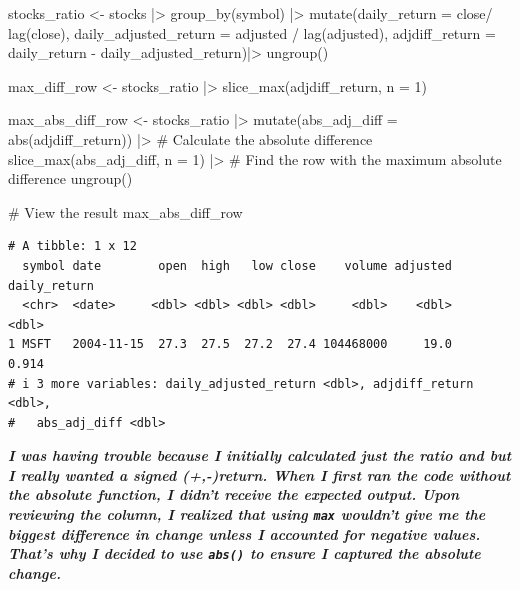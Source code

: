 \documentclass[
  letterpaper,
  DIV=11,
  numbers=noendperiod]{scrartcl}
\newenvironment{Shaded}{\begin{snugshade}}{\end{snugshade}}
\newcommand{\AttributeTok}[1]{\textcolor[rgb]{0.40,0.45,0.13}{#1}}
\newcommand{\CommentTok}[1]{\textcolor[rgb]{0.37,0.37,0.37}{#1}}
\newcommand{\DecValTok}[1]{\textcolor[rgb]{0.68,0.00,0.00}{#1}}
\newcommand{\FunctionTok}[1]{\textcolor[rgb]{0.28,0.35,0.67}{#1}}
\newcommand{\NormalTok}[1]{\textcolor[rgb]{0.00,0.23,0.31}{#1}}
\newcommand{\OtherTok}[1]{\textcolor[rgb]{0.00,0.23,0.31}{#1}}
\newcommand{\SpecialCharTok}[1]{\textcolor[rgb]{0.37,0.37,0.37}{#1}}
\begin{document}
\begin{Shaded}
\begin{Highlighting}[]
\NormalTok{stocks\_ratio }\OtherTok{\textless{}{-}}\NormalTok{ stocks }\SpecialCharTok{|\textgreater{}}
  \FunctionTok{group\_by}\NormalTok{(symbol) }\SpecialCharTok{|\textgreater{}}
  \FunctionTok{mutate}\NormalTok{(}\AttributeTok{daily\_return =}\NormalTok{ close}\SpecialCharTok{/} \FunctionTok{lag}\NormalTok{(close),}
         \AttributeTok{daily\_adjusted\_return =}\NormalTok{ adjusted }\SpecialCharTok{/} \FunctionTok{lag}\NormalTok{(adjusted),}
  \AttributeTok{adjdiff\_return =}\NormalTok{  daily\_return }\SpecialCharTok{{-}}\NormalTok{ daily\_adjusted\_return)}\SpecialCharTok{|\textgreater{}}
  \FunctionTok{ungroup}\NormalTok{()}

\NormalTok{max\_diff\_row }\OtherTok{\textless{}{-}}\NormalTok{ stocks\_ratio }\SpecialCharTok{|\textgreater{}}
  \FunctionTok{slice\_max}\NormalTok{(adjdiff\_return, }\AttributeTok{n =} \DecValTok{1}\NormalTok{)}

\NormalTok{max\_abs\_diff\_row }\OtherTok{\textless{}{-}}\NormalTok{ stocks\_ratio }\SpecialCharTok{|\textgreater{}}
  \FunctionTok{mutate}\NormalTok{(}\AttributeTok{abs\_adj\_diff =} \FunctionTok{abs}\NormalTok{(adjdiff\_return)) }\SpecialCharTok{|\textgreater{}}  \CommentTok{\# Calculate the absolute difference}
  \FunctionTok{slice\_max}\NormalTok{(abs\_adj\_diff, }\AttributeTok{n =} \DecValTok{1}\NormalTok{) }\SpecialCharTok{|\textgreater{}}  \CommentTok{\# Find the row with the maximum absolute difference}
  \FunctionTok{ungroup}\NormalTok{()}

\CommentTok{\# View the result}
\NormalTok{max\_abs\_diff\_row}
\end{Highlighting}
\end{Shaded}

\begin{verbatim}
# A tibble: 1 x 12
  symbol date        open  high   low close    volume adjusted daily_return
  <chr>  <date>     <dbl> <dbl> <dbl> <dbl>     <dbl>    <dbl>        <dbl>
1 MSFT   2004-11-15  27.3  27.5  27.2  27.4 104468000     19.0        0.914
# i 3 more variables: daily_adjusted_return <dbl>, adjdiff_return <dbl>,
#   abs_adj_diff <dbl>
\end{verbatim}

\textbf{\emph{I was having trouble because I initially calculated just
the ratio and but I really wanted a signed (+,-)return. When I first ran
the code without the absolute function, I didn't receive the expected
output. Upon reviewing the column, I realized that using \texttt{max}
wouldn't give me the biggest difference in change unless I accounted for
negative values. That's why I decided to use \texttt{abs()} to ensure I
captured the absolute change.}}
\end{document}
